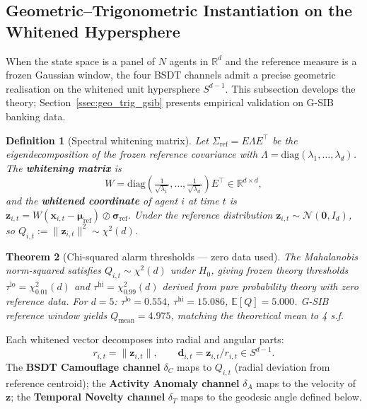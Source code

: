 \documentclass[11pt,a4paper]{article}
\newcommand{\R}{\mathbb{R}}
\newtheorem{theorem}{Theorem}
\newtheorem{definition}[theorem]{Definition}
\begin{document}
\subsection{Geometric--Trigonometric Instantiation on the Whitened Hypersphere}
\label{ssec:geo_trig_theory}

When the state space is a panel of $N$ agents in $\R^d$ and the
reference measure is a frozen Gaussian window, the four BSDT channels
admit a precise geometric realisation on the whitened unit hypersphere
$S^{d-1}$.  This subsection develops the theory; Section~\ref{ssec:geo_trig_gsib}
presents empirical validation on G-SIB banking data.

\begin{definition}[Spectral whitening matrix]
\label{def:whiten_main}
Let $\Sigma_{\mathrm{ref}} = E\Lambda E^\top$ be the eigendecomposition
of the frozen reference covariance with $\Lambda = \mathrm{diag}(\lambda_1,\ldots,\lambda_d)$.
The \textbf{whitening matrix} is
\begin{equation}
  W = \mathrm{diag}\!\left(\tfrac{1}{\sqrt{\lambda_1}},\ldots,
      \tfrac{1}{\sqrt{\lambda_d}}\right)E^\top \in \R^{d\times d},
  \label{eq:W_main}
\end{equation}
and the \textbf{whitened coordinate} of agent $i$ at time $t$ is
$\mathbf{z}_{i,t} = W(\mathbf{x}_{i,t} - \boldsymbol{\mu}_{\mathrm{ref}})
  \oslash \boldsymbol{\sigma}_{\mathrm{ref}}$.
Under the reference distribution $\mathbf{z}_{i,t}\sim\mathcal{N}(\mathbf{0},I_d)$,
so $Q_{i,t} := \|\mathbf{z}_{i,t}\|^2 \sim \chi^2(d)$.
\end{definition}

\begin{theorem}[Chi-squared alarm thresholds — zero data used]
\label{thm:chi2_main}
The Mahalanobis norm-squared satisfies $Q_{i,t}\sim\chi^2(d)$ under $H_0$,
giving frozen theory thresholds
$\tau^{\mathrm{lo}} = \chi^2_{0.01}(d)$ and
$\tau^{\mathrm{hi}} = \chi^2_{0.99}(d)$ derived from pure probability
theory with zero reference data.  For $d=5$:
$\tau^{\mathrm{lo}}=0.554$, $\tau^{\mathrm{hi}}=15.086$,
$\mathbb{E}[Q]=5.000$.
G-SIB reference window yields $Q_{\mathrm{mean}}=4.975$, matching the
theoretical mean to 4 s.f.
\end{theorem}

Each whitened vector decomposes into radial and angular parts:
\begin{equation}
  r_{i,t} = \|\mathbf{z}_{i,t}\|, \qquad
  \mathbf{d}_{i,t} = \mathbf{z}_{i,t}/r_{i,t} \in S^{d-1}.
  \label{eq:radial_angular}
\end{equation}
The \textbf{BSDT Camouflage channel} $\delta_C$ maps to $Q_{i,t}$ (radial
deviation from reference centroid); the \textbf{Activity Anomaly channel}
$\delta_A$ maps to the velocity of $\mathbf{z}$; the \textbf{Temporal
Novelty channel} $\delta_T$ maps to the geodesic angle defined below.
\end{document}
